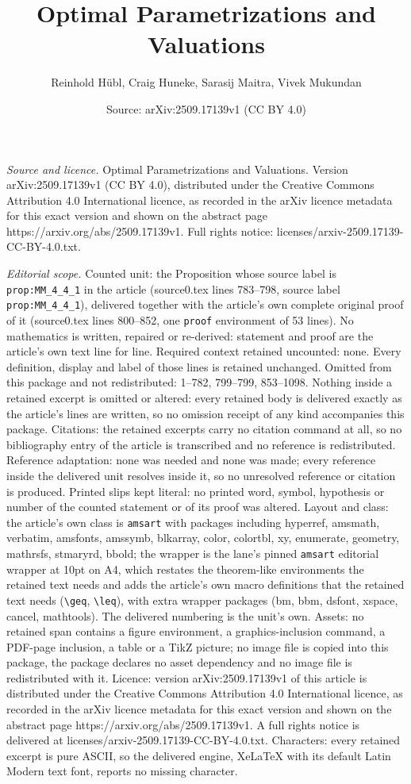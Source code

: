 \documentclass[10pt,a4paper]{amsart}
\title[Optimal Parametrizations and Valuations]{Optimal Parametrizations and Valuations}
\author{Reinhold H\"ubl, Craig Huneke, Sarasij Maitra, Vivek Mukundan}
\date{Source: arXiv:2509.17139v1 (CC BY 4.0)}
\begin{document}
\maketitle

\noindent\emph{Source and licence.} Optimal Parametrizations and Valuations. Version arXiv:2509.17139v1 (CC BY 4.0), distributed under the Creative Commons Attribution 4.0 International licence, as recorded in the arXiv licence metadata for this exact version and shown on the abstract page https://arxiv.org/abs/2509.17139v1. Full rights notice: licenses/arxiv-2509.17139-CC-BY-4.0.txt.\par\smallskip

\noindent\textit{Editorial scope.} Counted unit: the Proposition whose source label is \texttt{prop:MM\_4\_4\_1} in the article (source0.tex lines 783--798, source label \texttt{prop:MM\_4\_4\_1}), delivered together with the article's own complete original proof of it (source0.tex lines 800--852, one \texttt{proof} environment of 53 lines). No mathematics is written, repaired or re-derived: statement and proof are the article's own text line for line. Required context retained uncounted: none. Every definition, display and label of those lines is retained unchanged. Omitted from this package and not redistributed: 1--782, 799--799, 853--1098. Nothing inside a retained excerpt is omitted or altered: every retained body is delivered exactly as the article's lines are written, so no omission receipt of any kind accompanies this package. Citations: the retained excerpts carry no citation command at all, so no bibliography entry of the article is transcribed and no reference is redistributed. Reference adaptation: none was needed and none was made; every reference inside the delivered unit resolves inside it, so no unresolved reference or citation is produced. Printed slips kept literal: no printed word, symbol, hypothesis or number of the counted statement or of its proof was altered. Layout and class: the article's own class is \texttt{amsart} with packages including hyperref, amsmath, verbatim, amsfonts, amssymb, blkarray, color, colortbl, xy, enumerate, geometry, mathrsfs, stmaryrd, bbold; the wrapper is the lane's pinned \texttt{amsart} editorial wrapper at 10pt on A4, which restates the theorem-like environments the retained text needs and adds the article's own macro definitions that the retained text needs (\texttt{\textbackslash geq}, \texttt{\textbackslash leq}), with extra wrapper packages (bm, bbm, dsfont, xspace, cancel, mathtools). The delivered numbering is the unit's own. Assets: no retained span contains a figure environment, a graphics-inclusion command, a PDF-page inclusion, a table or a TikZ picture; no image file is copied into this package, the package declares no asset dependency and no image file is redistributed with it. Licence: version arXiv:2509.17139v1 of this article is distributed under the Creative Commons Attribution 4.0 International licence, as recorded in the arXiv licence metadata for this exact version and shown on the abstract page https://arxiv.org/abs/2509.17139v1. A full rights notice is delivered at licenses/arxiv-2509.17139-CC-BY-4.0.txt. Characters: every retained excerpt is pure ASCII, so the delivered engine, XeLaTeX with its default Latin Modern text font, reports no missing character.
\end{document}
